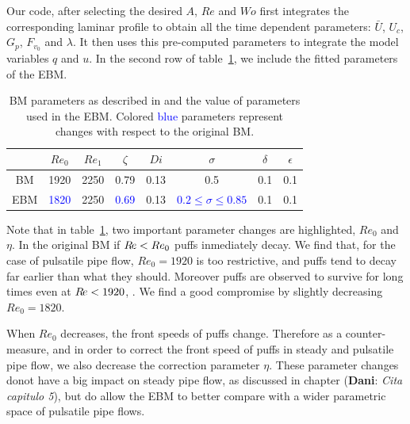 \documentclass{article}
\DeclareRobustCommand{\dm}[1]{{\color{blue}(\textbf{Dani}: \textit{#1}\xspace)}}
\DeclareRobustCommand{\Reynolds}{\ensuremath{R\hspace{-0.1em}e}\xspace}     %
\begin{document}
Our code, after selecting the desired $A$, $Re$ and $Wo$ first integrates the corresponding laminar profile to obtain all the time dependent parameters: $\bar{U}$, $U_{c}$, $G_{p}$, $F_{v_{0}}$ and $\lambda$. It then uses this pre-computed parameters to integrate the model variables $q$ and $u$. In the second row of table~\ref{tab:params}, we include the fitted parameters of the EBM.

\begin{table}
\centering
\begin{tabular}{cccccccc}
              &$Re_{0}$ & $Re_{1}$ & $\zeta$ & $Di$  & $\sigma$ & $\delta$ & $\epsilon$ \\ \hline
BM & 1920    & 2250     & 0.79    & 0.13 & 0.5      & 0.1      & 0.1         \\ 
EBM& \textcolor{blue}{1820}    & 2250     & \textcolor{blue}{0.69}    & 0.13 & \textcolor{blue}{$0.2\leq \sigma \leq0.85$} & 0.1 & 0.1
\end{tabular}
\caption{BM parameters as described in \cite{barkley2015rise} and the value of parameters used in the EBM. Colored \textcolor{blue}{blue} parameters represent changes with respect to the original BM.}
\label{tab:params}
\end{table}

Note that in table~\ref{tab:params}, two important parameter changes are highlighted, $Re_{0}$ and $\eta$. In the original BM if $\Reynolds < Re_{0}$ puffs inmediately decay. We find that, for the case of pulsatile pipe flow, $Re_{0}=1920$ is too restrictive, and puffs tend to decay far earlier than what they should. Moreover puffs are observed to survive for long times even at $\Reynolds < 1920$, \cite{avila2010}. We find a good compromise by slightly decreasing $Re_{0}=1820$. 

When $Re_{0}$ decreases, the front speeds of puffs change. Therefore as a counter-measure, and in order to correct the front speed of puffs in steady and pulsatile pipe flow, we also decrease the correction parameter $\eta$. These parameter changes donot have a big impact on steady pipe flow, as discussed in chapter \dm{Cita capitulo 5}, but do allow the EBM to better compare with a wider parametric space of pulsatile pipe flows.

\end{document}
